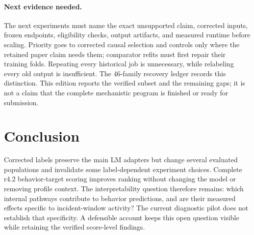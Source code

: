 \paragraph{Next evidence needed.}
The next experiments must name the exact unsupported claim, corrected inputs,
frozen endpoints, eligibility checks, output artifacts, and measured runtime
before scaling. Priority goes to corrected causal selection and controls only
where the retained paper claim needs them; comparator refits must first repair
their training folds. Repeating every historical job is unnecessary, while
relabeling every old output is insufficient. The 46-family recovery ledger
records this distinction. This edition reports the verified subset and the
remaining gaps; it is not a claim that the complete mechanistic program is
finished or ready for submission.

\section{Conclusion}
Corrected labels preserve the main LM adapters but change several evaluated
populations and invalidate some label-dependent experiment choices. Complete
r4.2 behavior-target scoring improves ranking without changing the model or
removing profile context. The interpretability question therefore remains:
which internal pathways contribute to behavior predictions, and are their
measured effects specific to incident-window activity? The current diagnostic
pilot does not establish that specificity. A defensible account keeps this open
question visible while retaining the verified score-level findings.
